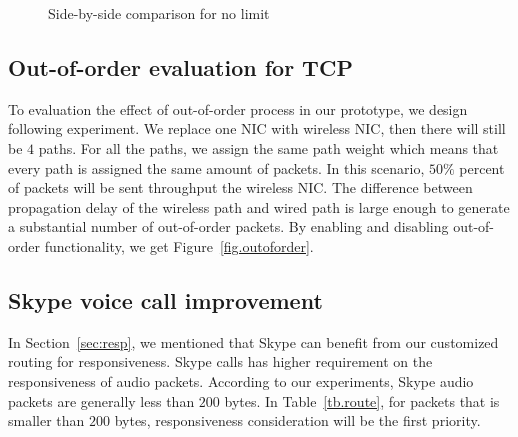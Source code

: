\begin{figure}[htb]
{

}
\caption{Side-by-side comparison for no limit}
\label{fig.no_limit}
\end{figure}


\subsection{Out-of-order evaluation for TCP}
\label{sec:reoder}

To evaluation the effect of out-of-order process in our prototype, we design following experiment. We replace one NIC with wireless NIC, then there will still be $4$ paths. For all the paths, we assign the same path weight which means that every path is assigned the same amount of packets. In this scenario, $50\%$ percent of packets will be sent throughput the wireless NIC. The difference between propagation delay of the wireless path and wired path is large enough to generate a substantial number of out-of-order packets. By enabling and disabling out-of-order functionality, we get Figure~\ref{fig.outoforder}.


\subsection{Skype voice call improvement}
\label{sec:skype}

In Section~\ref{sec:resp}, we mentioned that Skype can benefit from our customized routing for responsiveness. Skype calls has higher requirement on the responsiveness of audio packets. According to our experiments, Skype audio packets are generally less than $200$ bytes. In Table~\ref{tb.route}, for packets that is smaller than $200$ bytes, responsiveness consideration will be the first priority. 

